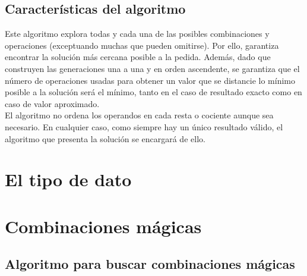 \documentclass{article}
\begin{document}
\subsection{Características del algoritmo}
Este algoritmo explora todas y cada una de las posibles combinaciones y operaciones (exceptuando muchas que pueden omitirse). Por ello, garantiza encontrar la solución más cercana posible a la pedida. Además, dado que construyen las generaciones una a una y en orden ascendente, se garantiza que el número de operaciones usadas para obtener un valor que se distancie lo mínimo posible a la solución será el mínimo, tanto en el caso de resultado exacto como en caso de valor aproximado.\\

El algoritmo no ordena los operandos en cada resta o cociente aunque sea necesario. En cualquier caso, como siempre hay un único resultado válido, el algoritmo que presenta la solución se encargará de ello.

\section{El tipo de dato}

\section{Combinaciones mágicas}
\subsection{Algoritmo para buscar combinaciones mágicas}
\end{document}
